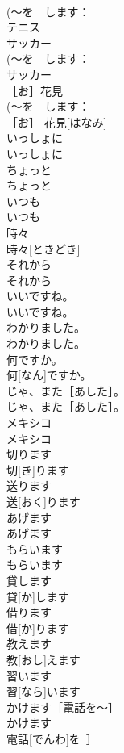 \documentclass[8pt]{extreport}
\begin{document}
\begin{CJK}{UTF8}{min}
\\	(～を　します：
\\	テニス	
\\	サッカー	
\\	(～を　します：
\\	サッカー	
\\	［お］花見	
\\	(～を　します：
\\	［お］ 花見[はなみ]	
\\	いっしょに	
\\	いっしょに	
\\	ちょっと	
\\	ちょっと	
\\	いつも	
\\	いつも	
\\	時々	
\\	時々[ときどき]	
\\	それから	
\\	それから	
\\	いいですね。	
\\	いいですね。	
\\	わかりました。	
\\	わかりました。	
\\	何ですか。	
\\	何[なん]ですか。	
\\	じゃ、また［あした］。	
\\	じゃ、また［あした］。	
\\	メキシコ	
\\	メキシコ	
\\	切ります	
\\	切[き]ります	
\\	送ります	
\\	送[おく]ります	
\\	あげます	
\\	あげます	
\\	もらいます	
\\	もらいます	
\\	貸します	
\\	貸[か]します	
\\	借ります	
\\	借[か]ります	
\\	教えます	
\\	教[おし]えます	
\\	習います	
\\	習[なら]います	
\\	かけます［電話を～］	
\\	かけます
\\	電話[でんわ]を~］	

\end{CJK}
\end{document}

